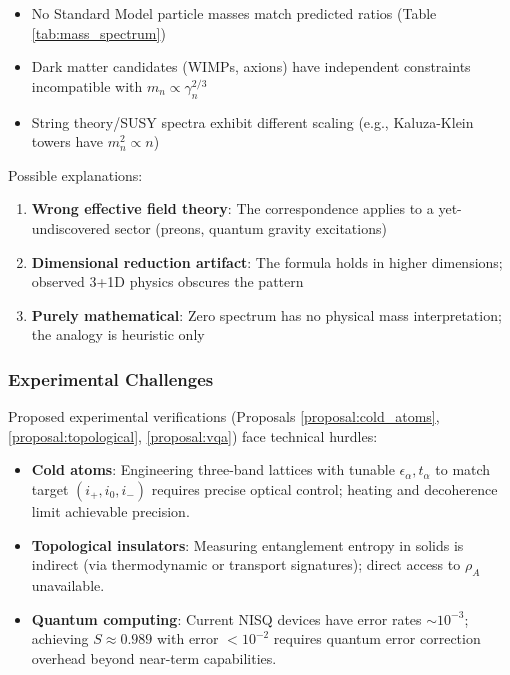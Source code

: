 \documentclass[12pt]{article}
\theoremstyle{plain}
\theoremstyle{definition}
\begin{document}
\begin{itemize}
\item No Standard Model particle masses match predicted ratios (Table \ref{tab:mass_spectrum})
\item Dark matter candidates (WIMPs, axions) have independent constraints incompatible with $m_n \propto \gamma_n^{2/3}$
\item String theory/SUSY spectra exhibit different scaling (e.g., Kaluza-Klein towers have $m_n^2 \propto n$)
\end{itemize}

Possible explanations:
\begin{enumerate}
\item \textbf{Wrong effective field theory}: The correspondence applies to a yet-undiscovered sector (preons, quantum gravity excitations)
\item \textbf{Dimensional reduction artifact}: The formula holds in higher dimensions; observed 3+1D physics obscures the pattern
\item \textbf{Purely mathematical}: Zero spectrum has no physical mass interpretation; the analogy is heuristic only
\end{enumerate}

\subsubsection{Experimental Challenges}

Proposed experimental verifications (Proposals \ref{proposal:cold_atoms}, \ref{proposal:topological}, \ref{proposal:vqa}) face technical hurdles:

\begin{itemize}
\item \textbf{Cold atoms}: Engineering three-band lattices with tunable $\epsilon_\alpha, t_\alpha$ to match target $(i_+, i_0, i_-)$ requires precise optical control; heating and decoherence limit achievable precision.

\item \textbf{Topological insulators}: Measuring entanglement entropy in solids is indirect (via thermodynamic or transport signatures); direct access to $\rho_A$ unavailable.

\item \textbf{Quantum computing}: Current NISQ devices have error rates $\sim 10^{-3}$; achieving $S \approx 0.989$ with error $< 10^{-2}$ requires quantum error correction overhead beyond near-term capabilities.
\end{itemize}
\end{document}
